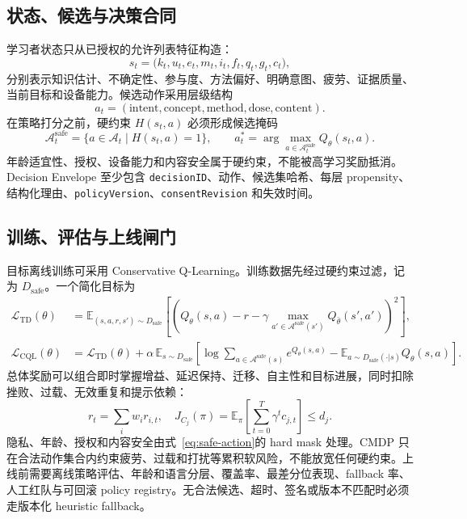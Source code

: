 \documentclass[11pt,a4paper,fontset=none]{ctexart}
\newcommand{\code}[1]{\begingroup\urlstyle{tt}\nolinkurl{#1}\endgroup}
\begin{document}
\subsection{状态、候选与决策合同}
学习者状态只从已授权的允许列表特征构造：
\begin{equation}
  s_t = \bigl(k_t,u_t,e_t,m_t,i_t,f_t,q_t,g_t,c_t\bigr),
\end{equation}
分别表示知识估计、不确定性、参与度、方法偏好、明确意图、疲劳、证据质量、当前目标和设备能力。候选动作采用层级结构
\begin{equation}
  a_t=(\text{intent},\text{concept},\text{method},\text{dose},\text{content}).
\end{equation}
在策略打分之前，硬约束 $H(s_t,a)$ 必须形成候选掩码
\begin{equation}
  \mathcal A_t^{\mathrm{safe}}=\{a\in\mathcal A_t\mid H(s_t,a)=1\},
  \qquad
  a_t^*=\arg\max_{a\in\mathcal A_t^{\mathrm{safe}}} Q_\theta(s_t,a).
  \label{eq:safe-action}
\end{equation}
年龄适宜性、授权、设备能力和内容安全属于硬约束，不能被高学习奖励抵消。Decision Envelope 至少包含 \code{decisionID}、动作、候选集哈希、每层 propensity、结构化理由、\code{policyVersion}、\code{consentRevision} 和失效时间。

\subsection{训练、评估与上线闸门}
目标离线训练可采用 Conservative Q-Learning。训练数据先经过硬约束过滤，记为 $D_{\mathrm{safe}}$。一个简化目标为
\begin{align}
\mathcal L_{\mathrm{TD}}(\theta)
 &= \mathbb E_{(s,a,r,s')\sim D_{\mathrm{safe}}}
 \!\left[\left(Q_\theta(s,a)-r-\gamma
 \max_{a'\in\mathcal A^{\mathrm{safe}}(s')}Q_{\bar\theta}(s',a')\right)^2\right],\\
\mathcal L_{\mathrm{CQL}}(\theta)
 &= \mathcal L_{\mathrm{TD}}(\theta)
 +\alpha\,\mathbb E_{s\sim D_{\mathrm{safe}}}
 \left[\log\!\sum_{a\in\mathcal A^{\mathrm{safe}}(s)}e^{Q_\theta(s,a)}
 -\mathbb E_{a\sim D_{\mathrm{safe}}(\cdot|s)}Q_\theta(s,a)\right].
\end{align}
总体奖励可以组合即时掌握增益、延迟保持、迁移、自主性和目标进展，同时扣除挫败、过载、无效重复和提示依赖：
\begin{equation}
 r_t=\sum_i w_i r_{i,t},
 \quad
 J_{C_j}(\pi)=\mathbb E_\pi\!\left[\sum_{t=0}^{T}\gamma^t c_{j,t}\right]\le d_j.
\end{equation}
隐私、年龄、授权和内容安全由式~\eqref{eq:safe-action}的 hard mask 处理。CMDP 只在合法动作集合内约束疲劳、过载和打扰等累积软风险，不能放宽任何硬约束。上线前需要离线策略评估、年龄和语言分层、覆盖率、最差分位表现、fallback 率、人工红队与可回滚 policy registry。无合法候选、超时、签名或版本不匹配时必须走版本化 heuristic fallback。
\end{document}
